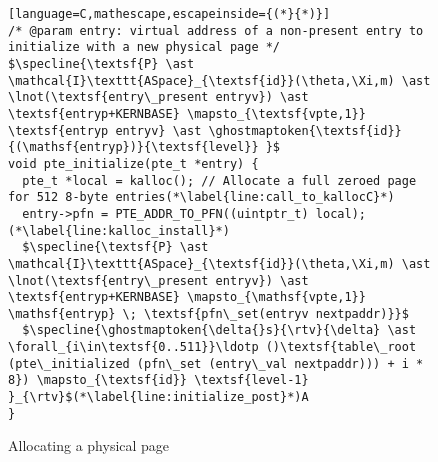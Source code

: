 \begin{figure}\footnotesize
  \begin{lstlisting}[language=C,mathescape,escapeinside={(*}{*)}]
/* @param entry: virtual address of a non-present entry to initialize with a new physical page */
$\specline{\textsf{P} \ast \mathcal{I}\texttt{ASpace}_{\textsf{id}}(\theta,\Xi,m) \ast \lnot(\textsf{entry\_present entryv}) \ast \textsf{entryp+KERNBASE} \mapsto_{\textsf{vpte,1}} \textsf{entryp entryv} \ast \ghostmaptoken{\textsf{id}}{(\mathsf{entryp})}{\textsf{level}} }$
void pte_initialize(pte_t *entry) {
  pte_t *local = kalloc(); // Allocate a full zeroed page for 512 8-byte entries(*\label{line:call_to_kallocC}*)
  entry->pfn = PTE_ADDR_TO_PFN((uintptr_t) local);(*\label{line:kalloc_install}*)
  $\specline{\textsf{P} \ast \mathcal{I}\texttt{ASpace}_{\textsf{id}}(\theta,\Xi,m) \ast \lnot(\textsf{entry\_present entryv}) \ast \textsf{entryp+KERNBASE} \mapsto_{\mathsf{vpte,1}} \mathsf{entryp} \; \textsf{pfn\_set(entryv nextpaddr)}}$
  $\specline{\ghostmaptoken{\delta{}s}{\rtv}{\delta} \ast \forall_{i\in\textsf{0..511}}\ldotp ()\textsf{table\_root (pte\_initialized (pfn\_set (entry\_val nextpaddr))) + i * 8}) \mapsto_{\textsf{id}} \textsf{level-1}   }_{\rtv}$(*\label{line:initialize_post}*)A
}
\end{lstlisting}
\vspace{-2em}
\caption{Allocating a physical page }
\label{pteinitializespecC}
\vspace{-1em}
\end{figure}

